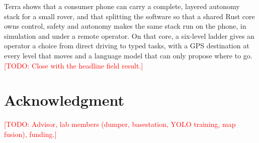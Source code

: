 \documentclass[conference]{IEEEtran}
\newcommand{\todo}[1]{\textcolor{red}{[TODO: #1]}}
\begin{document}
Terra shows that a consumer phone can carry a complete, layered autonomy stack for a small rover, and that splitting the software so that a shared Rust core owns control, safety and autonomy makes the same stack run on the phone, in simulation and under a remote operator.
On that core, a six-level ladder gives an operator a choice from direct driving to typed tasks, with a GPS destination at every level that moves and a language model that can only propose where to go.
\todo{Close with the headline field result.}

\section*{Acknowledgment}
\todo{Advisor, lab members (dumper, basestation, YOLO training, map fusion), funding.}



\end{document}
